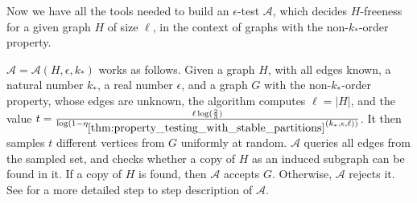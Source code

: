         Now we have all the tools needed to build an $\epsilon$-test $\mathcal{A}$, which decides
        $H$-freeness for a given graph $H$ of size $\ell$, in the context of graphs with the non-$k_*$-order property.

        $\mathcal{A} = \mathcal{A}(H,\epsilon,k_*)$ works as follows.
        Given a graph $H$, with all edges known, a natural number $k_*$, a real number $\epsilon$, and a graph $G$ with
        the non-$k_*$-order property, whose edges are unknown, the algorithm computes $\ell = |H|$, and the value
        $t = \frac{\ell \log( \frac{2}{3} )}
            {\log( 1 - \eta_{\ref{thm:property_testing_with_stable_partitions}}(k_*, \epsilon, \ell) )}$.
        It then samples $t$ different vertices from $G$ uniformly at random.
        $\mathcal{A}$ queries all edges from the sampled set, and checks whether a copy of $H$ as an induced
        subgraph can be found in it.
        If a copy of $H$ is found, then $\mathcal{A}$ accepts $G$.
        Otherwise, $\mathcal{A}$ rejects it.
        See  for a more detailed step to step description of $\mathcal{A}$.


